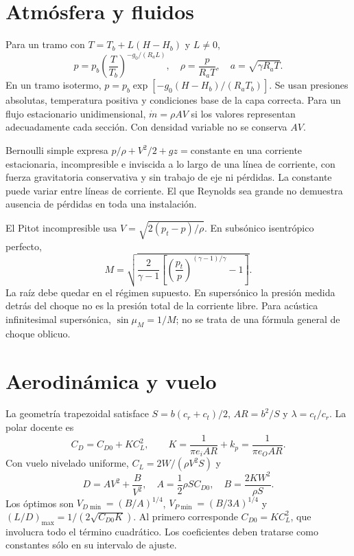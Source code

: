 \section{Atmósfera y fluidos}
Para un tramo con $T=T_b+L(H-H_b)$ y $L\ne0$,
\begin{equation}
p=p_b\left(\frac{T}{T_b}\right)^{-g_0/(R_aL)},\quad
\rho=\frac{p}{R_aT},\quad a=\sqrt{\gamma R_aT}.
\end{equation}
En un tramo isotermo, $p=p_b\exp[-g_0(H-H_b)/(R_aT_b)]$. Se usan presiones absolutas, temperatura positiva y condiciones base de la capa correcta. Para un flujo estacionario unidimensional, $\dot m=\rho AV$ si los valores representan adecuadamente cada sección. Con densidad variable no se conserva $AV$.

Bernoulli simple expresa $p/\rho+V^2/2+gz=\mathrm{constante}$ en una corriente estacionaria, incompresible e inviscida a lo largo de una línea de corriente, con fuerza gravitatoria conservativa y sin trabajo de eje ni pérdidas. La constante puede variar entre líneas de corriente. El que Reynolds sea grande no demuestra ausencia de pérdidas en toda una instalación.

El Pitot incompresible usa $V=\sqrt{2(p_t-p)/\rho}$. En subsónico isentrópico perfecto,
\begin{equation}
M=\sqrt{\frac{2}{\gamma-1}\left[\left(\frac{p_t}{p}\right)^{(\gamma-1)/\gamma}-1\right]}.
\end{equation}
La raíz debe quedar en el régimen supuesto. En supersónico la presión medida detrás del choque no es la presión total de la corriente libre. Para acústica infinitesimal supersónica, $\sin\mu_M=1/M$; no se trata de una fórmula general de choque oblicuo.

\section{Aerodinámica y vuelo}
La geometría trapezoidal satisface $S=b(c_r+c_t)/2$, $AR=b^2/S$ y $\lambda=c_t/c_r$. La polar docente es
\begin{equation}
C_D=C_{D0}+KC_L^2,\qquad
K=\frac{1}{\pi e_iAR}+k_p=\frac{1}{\pi e_OAR}.
\end{equation}
Con vuelo nivelado uniforme, $C_L=2W/(\rho V^2S)$ y
\begin{equation}
D=AV^2+\frac{B}{V^2},\quad A=\frac12\rho SC_{D0},\quad
B=\frac{2KW^2}{\rho S}.
\end{equation}
Los óptimos son $V_{D\min}=(B/A)^{1/4}$, $V_{P\min}=(B/3A)^{1/4}$ y $(L/D)_{\max}=1/(2\sqrt{C_{D0}K})$. Al primero corresponde $C_{D0}=KC_L^2$, que involucra todo el término cuadrático. Los coeficientes deben tratarse como constantes sólo en su intervalo de ajuste.

